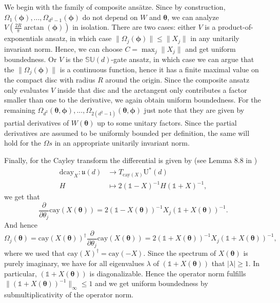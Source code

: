 \documentclass{article}
\renewcommand{\vec}[1]{\ensuremath{\boldsymbol{#1}}}
\begin{document}
We begin with the family of composite ansätze.
Since by construction, \(\Omega_1(\vec{\phi}), ..., \Omega_{d^2-1}(\vec{\phi})\) do not depend on \(W\) and \(\vec{\theta}\), we can analyze \(V\left(\frac{2R}{\pi} \arctan(\vec{\phi})\right)\) in isolation.
There are two cases: either \(V\) is a product-of-exponentials ansatz, in which case \(\lVert \Omega_j(\vec{\phi})\rVert \leq \lVert X_j \rVert\) in any unitarily invariant norm.
Hence, we can choose \(C = \max_j \lVert X_j \rVert\) and get uniform boundedness.
Or \(V\) is the \(\mathbb{SU}(d)\)-gate ansatz, in which case we can argue that the \(\lVert \Omega_j(\vec{\phi}) \rVert\) is a continuous function, hence it has a finite maximal value on the compact disc with radius \(R\) around the origin.
Since the composite ansatz only evaluates \(V\) inside that disc and the arctangent only contributes a factor smaller than one to the derivative, we again obtain uniform boundedness.
For the remaining \(\Omega_{d^2}(\vec{\theta}, \vec{\phi}), ..., \Omega_{2(d^2-1)}(\vec{\theta}, \vec{\phi})\) just note that they are given by partial derivatives of \(W(\vec{\theta})\) up to some unitary factors.
Since the partial derivatives are assumed to be uniformly bounded per definition, the same will hold for the \(\Omega s\) in an appropriate unitarily invariant norm.

Finally, for the Cayley transform the differential is given by (see Lemma 8.8 in \cite{hairer_geometric_2006})
\begin{align}
    \mathrm{d} \mathrm{cay}_X: \mathfrak{u}(d) &\rightarrow T_{\mathrm{cay}(X)}\mathrm{U}^*(d) \\
    H &\mapsto 2(\mathds{1}-X)^{-1} H (\mathds{1} + X)^{-1},
\end{align}
we get that
\begin{equation}
    \frac{\partial}{\partial \theta_j} \mathrm{cay}(X(\vec{\theta})) = 2(\mathds{1} - X(\vec{\theta}))^{-1}X_j(\mathds{1} + X(\vec{\theta}))^{-1}.
\end{equation}
And hence
\begin{equation}
    \Omega_j(\vec{\theta}) = \mathrm{cay}(X(\vec{\theta}))^\dagger \frac{\partial}{\partial \theta_j} \mathrm{cay}(X(\vec{\theta})) = 2(\mathds{1} + X(\vec{\theta}))^{-1} X_j (\mathds{1} + X(\vec{\theta}))^{-1},
\end{equation}
where we used that \(\mathrm{cay}(X)^\dagger = \mathrm{cay}(-X)\).
Since the spectrum of \(X(\vec{\theta})\) is purely imaginary, we have for all eigenvalues \(\lambda\) of \((\mathds{1} + X(\vec{\theta}))\) that \(\lvert \lambda \rvert \geq 1\).
In particular, \((\mathds{1} + X(\vec{\theta}))\) is diagonalizable.
Hence the operator norm fulfills \(\lVert (\mathds{1} + X(\vec{\theta}))^{-1} \rVert_\infty \leq 1\) and we get uniform boundedness by submultiplicativity of the operator norm.
\end{document}
